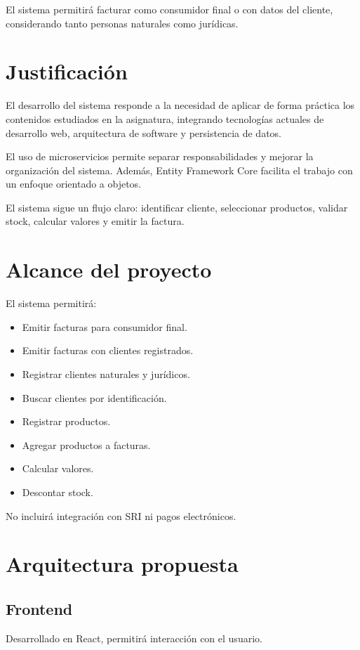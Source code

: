 \documentclass[12pt]{article}
\begin{document}
El sistema permitirá facturar como consumidor final o con datos del cliente, considerando tanto personas naturales como jurídicas.

\section{Justificación}
El desarrollo del sistema responde a la necesidad de aplicar de forma práctica los contenidos estudiados en la asignatura, integrando tecnologías actuales de desarrollo web, arquitectura de software y persistencia de datos.

El uso de microservicios permite separar responsabilidades y mejorar la organización del sistema. Además, Entity Framework Core facilita el trabajo con un enfoque orientado a objetos.

El sistema sigue un flujo claro: identificar cliente, seleccionar productos, validar stock, calcular valores y emitir la factura.

\section{Alcance del proyecto}
El sistema permitirá:
\begin{itemize}
\item Emitir facturas para consumidor final.
\item Emitir facturas con clientes registrados.
\item Registrar clientes naturales y jurídicos.
\item Buscar clientes por identificación.
\item Registrar productos.
\item Agregar productos a facturas.
\item Calcular valores.
\item Descontar stock.
\end{itemize}

No incluirá integración con SRI ni pagos electrónicos.

\section{Arquitectura propuesta}

\subsection*{Frontend}
Desarrollado en React, permitirá interacción con el usuario.
\end{document}
